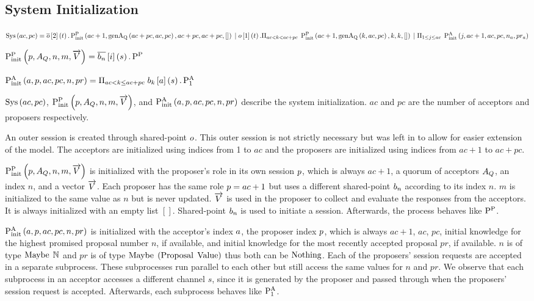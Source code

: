 \subsection{System Initialization}
$\operatorname{Sys}\left(ac, pc\right) = \overline{o}\left[2\right]\left(t\right) . \operatorname{P^{P}_{init}}\left(ac + 1, \operatorname{genA_Q}\left(ac + pc, ac, pc\right), ac + pc, ac + pc, []\right)\\
\; | \; o\left[1\right]\left(t\right) . \Pi_{ac < k < ac + pc}\; \operatorname{P^{P}_{init}}\left(ac + 1, \operatorname{genA_Q}\left(k, ac, pc\right), k, k, []\right) \\
\; | \; \Pi_{1 \leq j \leq ac}\; \operatorname{P^{A}_{init}}\left(j, ac + 1, ac, pc, n_{a}, pr_{a}\right)$

$\operatorname{P^{P}_{init}}\left(p, A_Q, n, m, \overrightarrow{V}\right) = \overline{b_{n}}\left[i\right]\left(s\right) . \operatorname{P^{P}_{}} $

$\operatorname{P^{A}_{init}}\left(a, p, ac, pc, n, pr\right) = \Pi_{ac < k \le ac + pc}\; b_{k}\left[a\right]\left(s\right) . \operatorname{P^{A}_{1}}$

$\operatorname{Sys}\left(ac, pc\right)$, $\operatorname{P^{P}_{init}}\left(p, A_Q, n, m, \overrightarrow{V}\right)$, and $\operatorname{P^{A}_{init}}\left(a, p, ac, pc, n, pr\right)$ describe the system initialization.
$ac$ and $pc$ are the number of acceptors and proposers respectively.

An outer session is created through shared-point $o$.
This outer session is not strictly necessary but was left in to allow for easier extension of the model.
The acceptors are initialized using indices from 1 to $ac$ and the proposers are initialized using indices from $ac + 1$ to $ac + pc$.

$\operatorname{P^{P}_{init}}\left(p, A_Q, n, m, \overrightarrow{V}\right)$ is initialized with the proposer's role in its own session $p$, which is always $ac + 1$, a quorum of acceptors $A_Q$, an index $n$, and a vector $\overrightarrow{V}$.
Each proposer has the same role $p = ac + 1$ but uses a different shared-point $b_{n}$ according to its index $n$.
$m$ is initialized to the same value as $n$ but is never updated.
$\overrightarrow{V}$ is used in the proposer to collect and evaluate the responses from the acceptors.
It is always initialized with an empty list $[]$.
Shared-point $b_{n}$ is used to initiate a session.
Afterwards, the process behaves like $\operatorname{P^{P}_{}} $.

$\operatorname{P^{A}_{init}}\left(a, p, ac, pc, n, pr\right)$ is initialized with the acceptor's index $a$, the proposer index $p$, which is always $ac + 1$, $ac$, $pc$, initial knowledge for the highest promised proposal number $n$, if available, and initial knowledge for the most recently accepted proposal $pr$, if available.
$n$ is of type $\operatorname{Maybe}\; \mathbb{N}$ and $pr$ is of type $\operatorname{Maybe}\; \left(\operatorname{Proposal}\; \operatorname{Value}\right)$ thus both can be $\operatorname{Nothing}$.
Each of the proposers' session requests are accepted in a separate subprocess.
These subprocesses run parallel to each other but still access the same values for $n$ and $pr$.
We observe that each subprocess in an acceptor accesses a different channel $s$, since it is generated by the proposer and passed through when the proposers' session request is accepted.
Afterwards, each subprocess behaves like $\operatorname{P^{A}_{1}}$.

